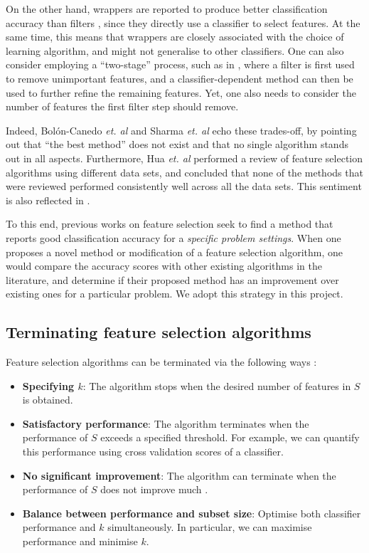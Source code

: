 \documentclass[12pt, twoside, a4paper]{report}
\begin{document}
On the other hand, wrappers are reported to produce better classification accuracy than filters \cite{RefWorks:163}, since they directly use a classifier to select features. At the same time, this means that wrappers are closely associated with the choice of learning algorithm, and might not generalise to other classifiers. One can also consider employing a ``two-stage'' process, such as in \cite{RefWorks:216}, where a filter is first used to remove unimportant features, and a classifier-dependent method can then be used to further refine the remaining features. Yet, one also needs to consider the number of features the first filter step should remove.

Indeed, Bolón-Canedo \textit{et. al} \cite{RefWorks:163} and Sharma \textit{et. al} \cite{RefWorks:215} echo these trades-off, by pointing out that ``the best method'' does not exist and that no single algorithm stands out in all aspects. Furthermore, Hua \textit{et. al} \cite{RefWorks:216} performed a review of feature selection algorithms using different data sets, and concluded that none of the methods that were reviewed performed consistently well across all the data sets. This sentiment is also reflected in \cite{RefWorks:217}.

To this end, previous works on feature selection seek to find a method that reports good classification accuracy for a \textit{specific problem settings}. When one proposes a novel method or modification of a feature selection algorithm, one would compare the accuracy scores with other existing algorithms in the literature, and determine if their proposed method has an improvement over existing ones for a particular problem. We adopt this strategy in this project.

\subsection{Terminating feature selection algorithms} \label{bg:fs:terminating}

Feature selection algorithms can be terminated via the following ways \cite{RefWorks:210}:
\begin{itemize}
  \item \textbf{Specifying $k$}: The algorithm stops when the desired number of features in $S$ is obtained.
  \item \textbf{Satisfactory performance}: The algorithm terminates when the performance of $S$ exceeds a specified threshold. For example, we can quantify this performance using cross validation scores of a classifier.
  \item \textbf{No significant improvement}: The algorithm can terminate when the performance of $S$ does not improve much \cite{RefWorks:215}.
  \item \textbf{Balance between performance and subset size}: Optimise both classifier performance and $k$ simultaneously. In particular, we can maximise performance and minimise $k$.
\end{itemize}
\end{document}
